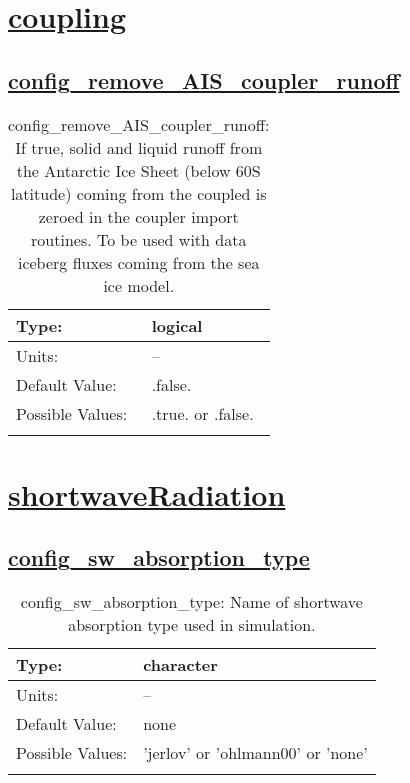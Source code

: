 \section[coupling]{\hyperref[sec:nm_tab_coupling]{coupling}}
\label{sec:nm_sec_coupling}
\subsection[config\_remove\_AIS\_coupler\_runoff]{\hyperref[sec:nm_tab_coupling]{config\_remove\_AIS\_coupler\_runoff}}
\label{subsec:nm_sec_config_remove_AIS_coupler_runoff}
\begin{center}
\begin{longtable}{| p{2.0in} || p{4.0in} |}
    \hline
    Type: & logical \\
    \hline
    Units: & -- \\
    \hline
    Default Value: & .false. \\
    \hline
    Possible Values: & .true. or .false. \\
    \hline
    \caption{config\_remove\_AIS\_coupler\_runoff: If true, solid and liquid runoff from the Antarctic Ice Sheet (below 60S latitude) coming from the coupled is zeroed in the coupler import routines.  To be used with data iceberg fluxes coming from the sea ice model.}
\end{longtable}
\end{center}
\section[shortwaveRadiation]{\hyperref[sec:nm_tab_shortwaveRadiation]{shortwaveRadiation}}
\label{sec:nm_sec_shortwaveRadiation}
\subsection[config\_sw\_absorption\_type]{\hyperref[sec:nm_tab_shortwaveRadiation]{config\_sw\_absorption\_type}}
\label{subsec:nm_sec_config_sw_absorption_type}
\begin{center}
\begin{longtable}{| p{2.0in} || p{4.0in} |}
    \hline
    Type: & character \\
    \hline
    Units: & -- \\
    \hline
    Default Value: & none \\
    \hline
    Possible Values: & 'jerlov' or 'ohlmann00' or 'none' \\
    \hline
    \caption{config\_sw\_absorption\_type: Name of shortwave absorption type used in simulation.}
\end{longtable}
\end{center}
